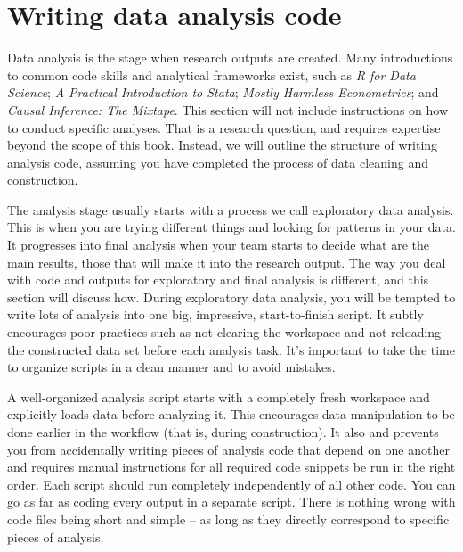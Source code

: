\section{Writing data analysis code}

Data analysis is the stage when research outputs are created. 
Many introductions to common code skills and analytical frameworks exist, such as
\textit{R for Data Science};
\textit{A Practical Introduction to Stata};
\textit{Mostly Harmless Econometrics}; 
and \textit{Causal Inference: The Mixtape}.
This section will not include instructions on how to conduct specific analyses.
That is a research question, and requires expertise beyond the scope of this book.
Instead, we will outline the structure of writing analysis code,
assuming you have completed the process of data cleaning and construction.

The analysis stage usually starts with a process we call exploratory data analysis.
This is when you are trying different things and looking for patterns in your data. 
It progresses into final analysis when your team starts to decide what are the main results, those that will make it into the research output.
The way you deal with code and outputs for exploratory and final analysis is different, and this section will discuss how.
During exploratory data analysis, you will be tempted to write lots of analysis into one big, impressive, start-to-finish script. 
It subtly encourages poor practices such as not clearing the workspace and not reloading the constructed data set before each analysis task. 
It's important to take the time to organize scripts in a clean manner and to avoid mistakes.

A well-organized analysis script starts with a completely fresh workspace and explicitly loads data before analyzing it.
This encourages data manipulation to be done earlier in the workflow (that is, during construction).
It also and prevents you from accidentally writing pieces of analysis code that depend on one another and requires manual instructions for all required code snippets be run in the right order.
Each script should run completely independently of all other code.
You can go as far as coding every output in a separate script.
There is nothing wrong with code files being short and simple -- as long as they directly correspond to specific pieces of analysis.

